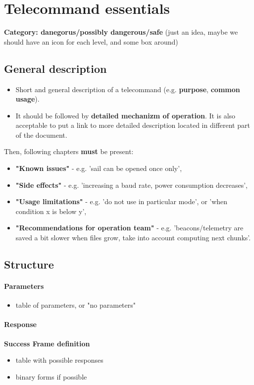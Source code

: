 \section{Telecommand essentials}

\textbf{Category: danegorus/possibly dangerous/safe} (just an idea, maybe we should have an icon for each level, and some box around)

\subsection{General description}
\begin{itemize}
    \item Short and general description of a telecommand (e.g. \textbf{purpose}, \textbf{common usage}).
    \item It should be followed by \textbf{detailed mechanizm of operation}. It is also acceptable to put a link to more detailed description located in different part of the document.
\end{itemize}

Then, following chapters \textbf{must} be present:
\begin{itemize}
    \item \textbf{"Known issues"} - e.g. 'sail can be opened once only',
    \item \textbf{"Side effects"} - e.g. 'increasing a baud rate, power consumption decreases',
    \item \textbf{"Usage limitations"} - e.g. 'do not use in particular mode', or 'when condition x is below y',
    \item \textbf{"Recommendations for operation team"} - e.g. 'beacons/telemetry are saved a bit slower when files grow, take into account computing next chunks'.
\end{itemize}

\subsection{Structure}

\paragraph{Parameters}
    \begin{itemize}
    \item table of parameters, or "no parameters"
    \end{itemize}


\paragraph{Response}
    \textbf{Success Frame definition}
    \begin{itemize}
        \item table with possible responses
        \item binary forms if possible
    \end{itemize}


